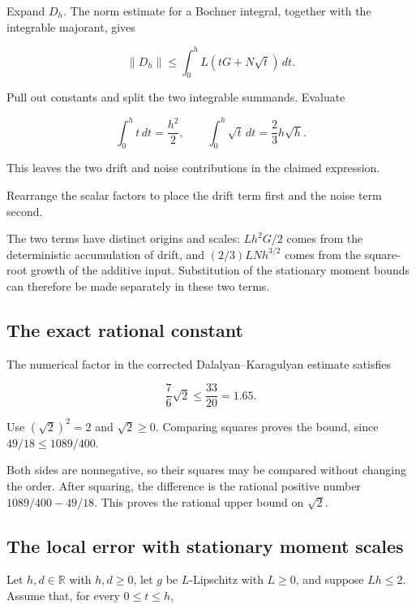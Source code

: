 \documentclass[11pt,a4paper]{report}
\begin{document}
Expand \(D_h\). The norm estimate for a Bochner integral, together with the integrable majorant, gives

\[\|D_h\|\le\int_0^h L(tG+N\sqrt t)\,dt.\]

Pull out constants and split the two integrable summands. Evaluate

\[\int_0^h t\,dt=\frac{h^2}{2},\qquad \int_0^h\sqrt t\,dt=\frac23h\sqrt h.\]

This leaves the two drift and noise contributions in the claimed expression.



Rearrange the scalar factors to place the drift term first and the noise term second.



The two terms have distinct origins and scales: \(Lh^2G/2\) comes from the deterministic accumulation of drift, and \((2/3)LNh^{3/2}\) comes from the square-root growth of the additive input. Substitution of the stationary moment bounds can therefore be made separately in these two terms.

\subsection{\texorpdfstring{The exact rational constant}{The exact rational constant}}
\label{report-step-UnadjustedLangevin-LocalError-lean-8}


The numerical factor in the corrected Dalalyan–Karagulyan estimate satisfies

\[\frac76\sqrt2\le\frac{33}{20}=1.65.\]

Use \((\sqrt2)^2=2\) and \(\sqrt2\ge0\). Comparing squares proves the bound, since \(49/18\le1089/400\).



Both sides are nonnegative, so their squares may be compared without changing the order. After squaring, the difference is the rational positive number \(1089/400-49/18\). This proves the rational upper bound on \(\sqrt2\).

\subsection{\texorpdfstring{The local error with stationary moment scales}{The local error with stationary moment scales}}
\label{report-step-UnadjustedLangevin-LocalError-lean-9}


Let \(h,d\in\mathbb R\) with \(h,d\ge0\), let \(g\) be \(L\)-Lipschitz with \(L\ge0\), and suppose \(Lh\le2\). Assume that, for every \(0\le t\le h\),
\end{document}
